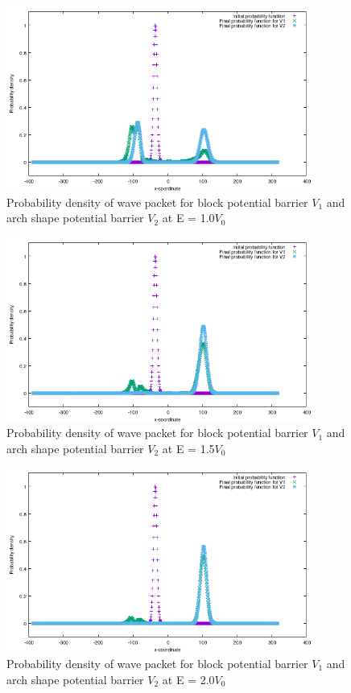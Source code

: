 \documentclass{article}
\begin{document}
\begin{figure}[H]
  \centering
  \includegraphics[width=0.9\textwidth]{case10.png}
  \caption{Probability density of wave packet for block potential barrier $V_1$ and arch shape potential barrier $V_2$ at E = 1.0$V_0$}
  \label{fig:10}
\end{figure}

\begin{figure}[H]
  \centering
  \includegraphics[width=0.9\textwidth]{case15.png}
  \caption{Probability density of wave packet for block potential barrier $V_1$ and arch shape potential barrier $V_2$ at E = 1.5$V_0$}
  \label{fig:15}
\end{figure}

\begin{figure}[H]
  \centering
  \includegraphics[width=0.9\textwidth]{case20.png}
  \caption{Probability density of wave packet for block potential barrier $V_1$ and arch shape potential barrier $V_2$ at E = 2.0$V_0$}
  \label{fig:20}
\end{figure}
\end{document}
